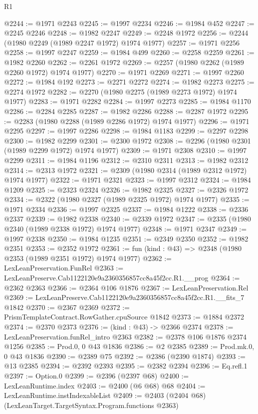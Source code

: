 \begin{lexlean}{R1}
\begin{coremodule}
@2244 := @1971 @2243
@2245 := @1997 @2234
@2246 := @1984 @452
@2247 := @2245 @2246
@2248 := @1982 @2247
@2249 := @2248 @1972
@2256 := @2244 (@1980 @2249 (@1989 @2247 @1972) @1974 @1977)
@2257 := @1971 @2256
@2258 := @1997 @2247
@2259 := @1984 @499
@2260 := @2258 @2259
@2261 := @1982 @2260
@2262 := @2261 @1972
@2269 := @2257 (@1980 @2262 (@1989 @2260 @1972) @1974 @1977)
@2270 := @1971 @2269
@2271 := @1997 @2260
@2272 := @1984 @192
@2273 := @2271 @2272
@2274 := @1982 @2273
@2275 := @2274 @1972
@2282 := @2270 (@1980 @2275 (@1989 @2273 @1972) @1974 @1977)
@2283 := @1971 @2282
@2284 := @1997 @2273
@2285 := @1984 @1170
@2286 := @2284 @2285
@2287 := @1982 @2286
@2288 := @2287 @1972
@2295 := @2283 (@1980 @2288 (@1989 @2286 @1972) @1974 @1977)
@2296 := @1971 @2295
@2297 := @1997 @2286
@2298 := @1984 @1183
@2299 := @2297 @2298
@2300 := @1982 @2299
@2301 := @2300 @1972
@2308 := @2296 (@1980 @2301 (@1989 @2299 @1972) @1974 @1977)
@2309 := @1971 @2308
@2310 := @1997 @2299
@2311 := @1984 @1196
@2312 := @2310 @2311
@2313 := @1982 @2312
@2314 := @2313 @1972
@2321 := @2309 (@1980 @2314 (@1989 @2312 @1972) @1974 @1977)
@2322 := @1971 @2321
@2323 := @1997 @2312
@2324 := @1984 @1209
@2325 := @2323 @2324
@2326 := @1982 @2325
@2327 := @2326 @1972
@2334 := @2322 (@1980 @2327 (@1989 @2325 @1972) @1974 @1977)
@2335 := @1971 @2334
@2336 := @1997 @2325
@2337 := @1984 @1222
@2338 := @2336 @2337
@2339 := @1982 @2338
@2340 := @2339 @1972
@2347 := @2335 (@1980 @2340 (@1989 @2338 @1972) @1974 @1977)
@2348 := @1971 @2347
@2349 := @1997 @2338
@2350 := @1984 @1235
@2351 := @2349 @2350
@2352 := @1982 @2351
@2353 := @2352 @1972
@2361 := fun (kind : @43) => @2348 (@1980 @2353 (@1989 @2351 @1972) @1974 @1977)
@2362 := LexLeanPreservation.FunRel
@2363 := LexLeanPreserve.Cab1122120e9a2360356857cc8a45f2cc.R1.__prog
@2364 := @2362 @2363
@2366 := @2364 @106 @1876
@2367 := LexLeanPreservation.Rel
@2369 := LexLeanPreserve.Cab1122120e9a2360356857cc8a45f2cc.R1.__fits_7 @1842
@2370 := @2367 @2369
@2372 := PrismTemplateContract.RowGather.cpuSource @1842
@2373 := @1884 @2372
@2374 := @2370 @2373
@2376 := (kind : @43) -> @2366 @2374
@2378 := LexLeanPreservation.funRel_intro @2363
@2382 := @2378 @106 @1876 @2374 @1256
@2385 := Prod.{0, 0} @43 @1836
@2386 := @2 @2385
@2389 := Prod.mk.{0, 0} @43 @1836
@2390 := @2389 @75
@2392 := @2386 (@2390 @1874)
@2393 := @13 @2385
@2394 := @2392 @2393
@2395 := @2382 @2394
@2396 := Eq.refl.{1}
@2397 := Option.{0}
@2399 := @2396 (@2397 @68)
@2400 := LexLeanRuntime.index
@2403 := @2400 (@6 @68) @68
@2404 := LexLeanRuntime.instIndexableList
@2409 := @2403 (@2404 @68) (LexLeanTarget.TargetSyntax.Program.functions @2363)

\end{coremodule}
\end{lexlean}
